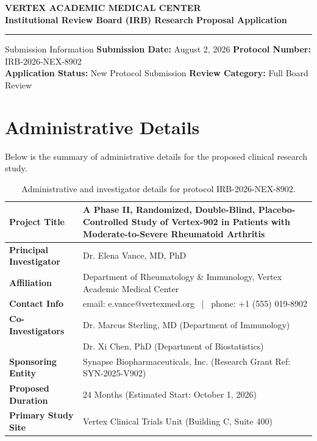 \begin{center}
    {\sffamily\bfseries\color{PrimaryColor}\Huge VERTEX ACADEMIC MEDICAL CENTER} \\
    {\sffamily\bfseries\color{SecondaryColor}\Large Institutional Review Board (IRB) Research Proposal Application} \\
    \vspace{0.3cm}
    \noindent\rule{\textwidth}{1.5pt}
\end{center}

\begin{info-box}{Submission Information}
    \textbf{Submission Date:} August 2, 2026 \hfill \textbf{Protocol Number:} IRB-2026-NEX-8902 \\
    \textbf{Application Status:} New Protocol Submission \hfill \textbf{Review Category:} Full Board Review
\end{info-box}

\section{Administrative Details}

Below is the summary of administrative details for the proposed clinical research study.

\begin{table}[h]
\centering
\sffamily
\small
\begin{tabularx}{\textwidth}{>{\raggedright\arraybackslash\bfseries\color{PrimaryColor}}l X}
\toprule
Project Title & A Phase II, Randomized, Double-Blind, Placebo-Controlled Study of Vertex-902 in Patients with Moderate-to-Severe Rheumatoid Arthritis \\
\midrule
Principal Investigator & Dr. Elena Vance, MD, PhD \\
Affiliation & Department of Rheumatology \& Immunology, Vertex Academic Medical Center \\
Contact Info & email: e.vance@vertexmed.org \ | \ phone: +1 (555) 019-8902 \\
\midrule
Co-Investigators & Dr. Marcus Sterling, MD (Department of Immunology) \\
& Dr. Xi Chen, PhD (Department of Biostatistics) \\
\midrule
Sponsoring Entity & Synapse Biopharmaceuticals, Inc. (Research Grant Ref: SYN-2025-V902) \\
Proposed Duration & 24 Months (Estimated Start: October 1, 2026) \\
Primary Study Site & Vertex Clinical Trials Unit (Building C, Suite 400) \\
\bottomrule
\end{tabularx}
\caption{Administrative and investigator details for protocol IRB-2026-NEX-8902.}
\label{tab:admin_details}
\end{table}

